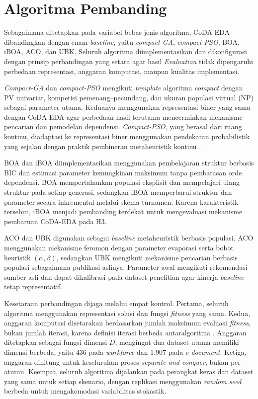 \section{Algoritma Pembanding}

Sebagaimana ditetapkan pada variabel bebas jenis algoritma, CoDA-EDA dibandingkan dengan enam \textit{baseline}, yaitu \textit{compact-GA}, \textit{compact-PSO}, BOA, iBOA, ACO, dan UBK. 
Seluruh algoritma diimplementasikan dan dikonfigurasi dengan prinsip perbandingan yang setara agar hasil \textit{Evaluation} tidak dipengaruhi perbedaan representasi, anggaran komputasi, maupun kualitas implementasi.

\textit{Compact-GA} dan \textit{compact-PSO} mengikuti \textit{template} algoritma \textit{compact} dengan PV univariat, kompetisi pemenang–pecundang, dan ukuran populasi virtual (NP) sebagai parameter utama. 
Keduanya menggunakan representasi biner yang sama dengan CoDA-EDA agar perbedaan hasil terutama mencerminkan mekanisme pencarian dan pemodelan dependensi. 
\textit{Compact-PSO}, yang berasal dari ruang kontinu, diadaptasi ke representasi biner menggunakan pendekatan probabilistik yang sejalan dengan praktik pembineran metaheuristik kontinu \parencite{pan_survey_2023}.

BOA dan iBOA diimplementasikan menggunakan pembelajaran struktur berbasis BIC dan estimasi parameter kemungkinan maksimum tanpa pembatasan orde dependensi. 
BOA mempertahankan populasi eksplisit dan mempelajari ulang struktur pada setiap generasi, sedangkan iBOA memperbarui struktur dan parameter secara inkremental melalui skema turnamen. 
Karena karakteristik tersebut, iBOA menjadi pembanding terdekat untuk mengevaluasi mekanisme pembaruan CoDA-EDA pada H3.

ACO dan UBK digunakan sebagai \textit{baseline} metaheuristik berbasis populasi. 
ACO menggunakan mekanisme feromon dengan parameter evaporasi serta bobot heuristik $(\alpha,\beta)$, sedangkan UBK mengikuti mekanisme pencarian berbasis populasi sebagaimana publikasi aslinya. 
Parameter awal mengikuti rekomendasi sumber asli dan dapat dikalibrasi pada dataset penelitian agar kinerja \textit{baseline} tetap representatif.

Kesetaraan perbandingan dijaga melalui empat kontrol. 
Pertama, seluruh algoritma menggunakan representasi solusi dan fungsi \textit{fitness} yang sama. 
Kedua, anggaran komputasi disetarakan berdasarkan jumlah maksimum evaluasi \textit{fitness}, bukan jumlah iterasi, karena definisi iterasi berbeda antaralgoritma \parencite{rajwar_exhaustive_2023,omran_permutation_2022}. 
Anggaran ditetapkan sebagai fungsi dimensi $D$, mengingat dua dataset utama memiliki dimensi berbeda, yaitu 436 pada \textit{workforce} dan 1.907 pada \textit{e-document}. 
Ketiga, anggaran dihitung untuk keseluruhan proses \textit{separate-and-conquer}, bukan per aturan. 
Keempat, seluruh algoritma dijalankan pada perangkat keras dan dataset yang sama untuk setiap skenario, dengan replikasi menggunakan \textit{random seed} berbeda untuk mengakomodasi variabilitas stokastik.

